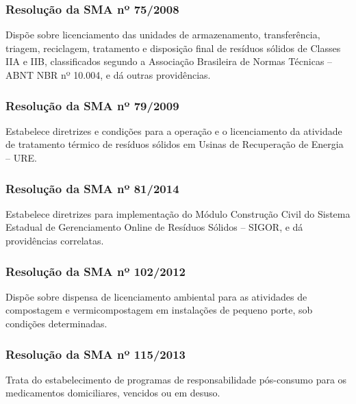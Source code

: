 \begin{subapend}
\begin{subsubapend}
		\subsubsection{Resolução da SMA nº 75/2008}
		Dispõe sobre licenciamento das unidades de armazenamento, transferência, triagem, reciclagem, tratamento e disposição final de resíduos sólidos de Classes IIA e IIB, classificados segundo a Associação Brasileira de Normas Técnicas – ABNT NBR nº 10.004, e dá outras providências.
		\subsubsection{Resolução da SMA nº 79/2009}
		Estabelece diretrizes e condições para a operação e o licenciamento da atividade de tratamento térmico de resíduos sólidos em Usinas de Recuperação de Energia – URE.
		\subsubsection{Resolução da SMA nº 81/2014}
		Estabelece diretrizes para implementação do Módulo Construção Civil do Sistema Estadual de Gerenciamento Online de Resíduos Sólidos – SIGOR, e dá providências correlatas.
		\subsubsection{Resolução da SMA nº 102/2012}
		Dispõe sobre dispensa de licenciamento ambiental para as atividades de compostagem e vermicompostagem em instalações de pequeno porte, sob condições determinadas.
		\subsubsection{Resolução da SMA nº 115/2013}
		Trata do estabelecimento de programas de responsabilidade pós-consumo para os medicamentos domiciliares, vencidos ou em desuso.
	\end{subsubapend}
\end{subapend}

